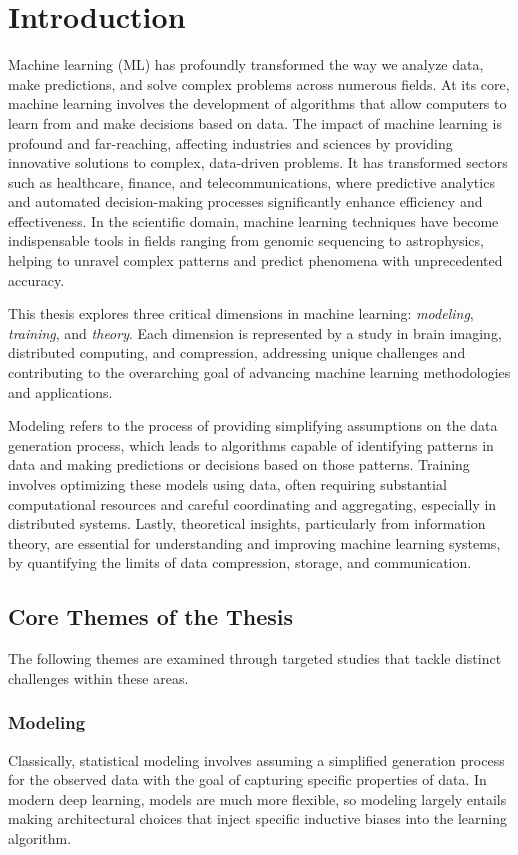 \chapter{Introduction} \label{ch:intro}

Machine learning (ML) has profoundly transformed the way we analyze data, make predictions, and solve complex problems across numerous fields. At its core, machine learning involves the development of algorithms that allow computers to learn from and make decisions based on data.
The impact of machine learning is profound and far-reaching, affecting industries and sciences by providing innovative solutions to complex, data-driven problems. It has transformed sectors such as healthcare, finance, and telecommunications, where predictive analytics and automated decision-making processes significantly enhance efficiency and effectiveness. In the scientific domain, machine learning techniques have become indispensable tools in fields ranging from genomic sequencing to astrophysics, helping to unravel complex patterns and predict phenomena with unprecedented accuracy.

This thesis explores three critical dimensions in machine learning: \textit{modeling}, \textit{training}, and \textit{theory}. Each dimension is represented by a study in brain imaging, distributed computing, and compression, addressing unique challenges and contributing to the overarching goal of advancing machine learning methodologies and applications.

Modeling refers to the process of providing simplifying assumptions on the data generation process, which leads to algorithms capable of identifying patterns in data and making predictions or decisions based on those patterns. Training involves optimizing these models using data, often requiring substantial computational resources and careful coordinating and aggregating, especially in distributed systems. Lastly, theoretical insights, particularly from information theory, are essential for understanding and improving machine learning systems, by quantifying the limits of data compression, storage, and communication.

\section{Core Themes of the Thesis}
The following themes are examined through targeted studies that tackle distinct challenges within these areas.

\subsection{Modeling}
Classically, statistical modeling involves assuming a simplified generation process for the observed data with the goal of capturing specific properties of data. In modern deep learning, models are much more flexible, so modeling largely entails making architectural choices that inject specific inductive biases into the learning algorithm.


